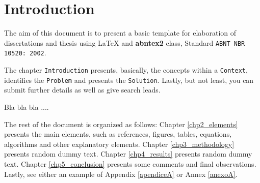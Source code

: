 \chapter[Introduction]{Introduction} 
\label{chp1_introduction} %

The aim of this document is to present a basic template for elaboration of dissertations and thesis using \LaTeX 
and \textbf{abntex2} class, Standard \texttt{ABNT NBR 10520: 2002}. 

The chapter \texttt{Introduction} presents, basically, the concepts within a \texttt{Context}, identifies the \texttt{Problem} and presents the \texttt{Solution}. Lastly, but not least, you can submit further details as well as give search leads.

Bla bla bla ....

The rest of the document is organized as follows: Chapter \ref{chp2_elements} presents the main elements, such as references, figures, tables, equations, algorithms and other explanatory elements. Chapter \ref{chp3_methodology} presents random dummy text. Chapter \ref{chp4_results} presents random dummy text. Chapter \ref{chp5_conclusion} presents some comments and final observations. Lastly, see either an example of Appendix \ref{apendiceA} or Annex \ref{anexoA}.



